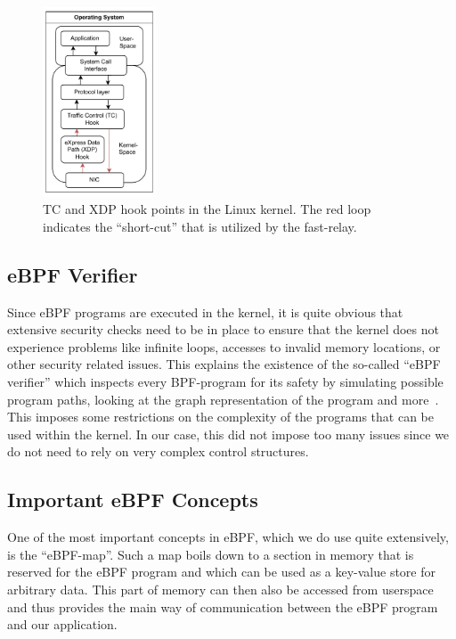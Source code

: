 \begin{figure}[H]
    \centering
    \includegraphics[width=0.3\textwidth]{figures/02_background/hook-point-locations.drawio.pdf}
    \caption[Hook points within network stack]{TC and XDP hook points in the Linux kernel.
    The red loop indicates the ``short-cut'' that is utilized by the fast-relay.
    }\label{fig:ebpf-hooks}
\end{figure}


\subsection{eBPF Verifier}
Since eBPF programs are executed in the kernel, it is quite obvious that extensive
security checks need to be in place to ensure that the kernel does not experience 
problems like infinite loops, accesses to invalid memory locations, or other security 
related issues.
This explains the existence of the so-called ``eBPF verifier'' which inspects 
every BPF-program for its safety by simulating possible program paths, 
looking at the graph representation of the program and more~\parencite{ebpf-verifier}.
This imposes some restrictions on the complexity of the programs that can be 
used within the kernel.
In our case, this did not impose too many issues since we do not need to rely on 
very complex control structures.

\subsection{Important eBPF Concepts}
One of the most important concepts in eBPF, which we do use quite extensively, is 
the ``eBPF-map''.
Such a map boils down to a section in memory that is reserved for the eBPF program
and which can be used as a key-value store for arbitrary data.
This part of memory can then also be accessed from userspace and thus provides the main 
way of communication between the eBPF program and our application.


